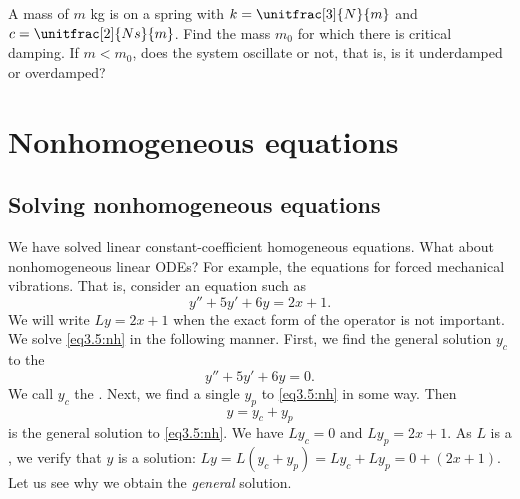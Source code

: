 \begin{exercise}
A mass of $m$ \unit{kg} is on a spring with $k=\unitfrac[3]{N}{m}$ and
$c=\unitfrac[2]{Ns}{m}$.  Find the mass $m_0$ for which there is critical
damping.  If $m < m_0$, does the system oscillate or not, that is, is it
underdamped or overdamped?
\end{exercise}


\sectionnewpage
\section{Nonhomogeneous equations}
\label{sec:nonhom}



\subsection{Solving nonhomogeneous equations}

We have solved linear constant-coefficient homogeneous 
equations.
What about nonhomogeneous linear ODEs?
For example, the equations for forced mechanical vibrations.
That is, consider an equation such as
\begin{equation} \label{eq3.5:nh}
y'' + 5y'+ 6y = 2x+1 .
\end{equation}
%
We will write $Ly = 2x+1$ when the exact form of the operator is not
important.
We solve \eqref{eq3.5:nh} in the following manner.  First, we find the general
solution $y_c$
to the \emph{}
\begin{equation} \label{eq3.5:h}
y'' + 5y'+ 6y = 0 .
\end{equation}
We call $y_c$ the \emph{}.
Next, we find a
single \emph{} $y_p$ to \eqref{eq3.5:nh} in some
way.  Then
\begin{equation*}
y = y_c + y_p
\end{equation*}
is the general solution to \eqref{eq3.5:nh}.  
We have $L y_c = 0$ and $L y_p = 2x+1$.  As
$L$ is a \emph{},
we verify that $y$ is a solution: $L y = L ( y_c + y_p) = L y_c + L y_p = 0
+ (2x+1)$.  Let us see
why we obtain the \emph{general} solution.

